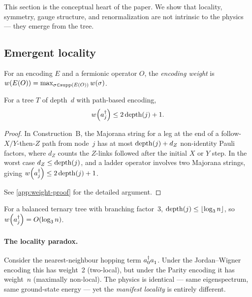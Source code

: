 %

This section is the conceptual heart of the paper.  We show that
locality, symmetry, gauge structure, and renormalization are not
intrinsic to the physics — they emerge from the tree.

\subsection{Emergent locality}
\label{sec:em-locality}

\begin{definition}
\label{def:encoding-weight}
For an encoding $E$ and a fermionic operator $O$, the
\emph{encoding weight} is
$w\!\left(E(O)\right) = \max_{\sigma \in \mathrm{supp}(E(O))} w\!\left(\sigma\right)$.
\end{definition}

\begin{theorem}
\label{thm:weight-bound}
For a tree $T$ of depth~$d$ with path-based encoding,
\begin{equation}
  w\!\left(a_{j}^{\dagger}\right) \le 2\,\mathrm{depth}(j) + 1.
  \label{eq:weight-bound}
\end{equation}
\end{theorem}

\begin{proof}
In Construction~B, the Majorana string for a leg at the end of a
follow-$X/Y$-then-$Z$ path from node~$j$ has at most $\mathrm{depth}(j) + d_Z$
non-identity Pauli factors, where $d_Z$ counts the $Z$-links followed
after the initial $X$ or $Y$ step.  In the worst case
$d_Z \le \mathrm{depth}(j)$, and a ladder operator involves two Majorana
strings, giving $w\!\left(a_{j}^{\dagger}\right) \le 2\,\mathrm{depth}(j) + 1$.

See \cref{app:weight-proof} for the detailed argument.
\end{proof}

\begin{corollary}
For a balanced ternary tree with branching factor~3,
$\mathrm{depth}(j) \le \lfloor \log_3 n \rfloor$, so
$w\!\left(a_{j}^{\dagger}\right) = O(\log_3 n)$.
\end{corollary}

\paragraph{The locality paradox.}
Consider the nearest-neighbour hopping term $\ad{0}\an{1}$.
Under the Jordan--Wigner encoding this has weight~2 (two-local), but
under the Parity encoding it has weight~$n$ (maximally non-local).
The physics is identical — same eigenspectrum, same ground-state energy
— yet the \emph{manifest locality} is entirely different.


